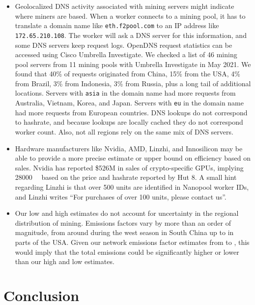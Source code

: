 \begin{itemize}
    \item Geolocalized DNS activity associated with mining servers might indicate where miners are based. When a worker connects to a mining pool, it has to translate a domain name like \texttt{eth.f2pool.com} to an IP address like \texttt{172.65.210.108}. The worker will ask a DNS server for this information, and some DNS servers keep request logs. OpenDNS request statistics can be accessed using Cisco Umbrella Investigate. We checked a list of 46 mining pool servers from 11 mining pools with Umbrella Investigate in May 2021. We found that 40\% of requests originated from China, 15\% from the USA, 4\% from Brazil, 3\% from Indonesia, 3\% from Russia, plus a long tail of additional locations. Servers with \texttt{asia} in the domain name had more requests from Australia, Vietnam, Korea, and Japan. Servers with \texttt{eu} in the domain name had more requests from European countries. DNS lookups do not correspond to hashrate, and because lookups are locally cached they do not correspond worker count. Also, not all regions rely on the same mix of DNS servers.
    
    \item Hardware manufacturers like Nvidia, AMD, Linzhi, and Innosilicon may be able to provide a more precise estimate or upper bound on efficiency based on sales. Nvidia has reported \$526M\cite{leswing_nvidia_2021} in sales of crypto-specific GPUs, implying \SI{28000}{\giga\hps} based on the price and hashrate reported by Hut 8\cite{pan_ethereum_2021}. A small hint regarding Linzhi is that over 500 units are identified in Nanopool worker IDs, and Linzhi writes ``For purchases of over 100 units, please contact us''.
    
    \item Our low and high estimates do not account for uncertainty in the regional distribution of mining. Emissions factors vary by more than an order of magnitude, from around  during the west season in South China up to  in parts of the USA. Given our network emissions factor estimates from  to , this would imply that the total emissions could be significantly higher or lower than our high and low estimates.
    
\end{itemize}

\section{Conclusion}

